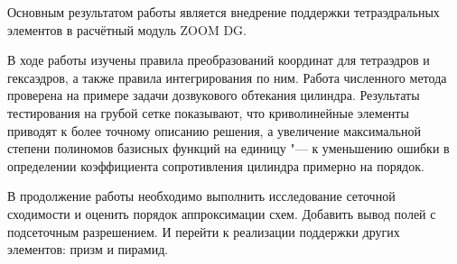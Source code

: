 


Основным результатом работы является внедрение поддержки тетраэдральных элементов в расчётный модуль ZOOM DG.

В ходе работы изучены правила преобразований координат для тетраэдров и гексаэдров, а также правила интегрирования по ним. Работа численного метода проверена на примере задачи дозвукового обтекания цилиндра. Результаты тестирования на грубой сетке показывают, что криволинейные элементы приводят к более точному описанию решения, а увеличение максимальной степени полиномов базисных функций на единицу "--- к уменьшению ошибки в определении коэффициента сопротивления цилиндра примерно на порядок.

В продолжение работы необходимо выполнить исследование сеточной сходимости и оценить порядок аппроксимации схем. Добавить вывод полей с подсеточным разрешением. И перейти к реализации поддержки других элементов: призм и пирамид.
